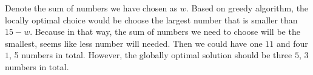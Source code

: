 \documentclass{assignment}
\begin{document}
\begin{homeworkProblem}
\begin{enumerate}
Denote the sum of numbers we have chosen as $w$. 
Based on greedy algorithm, the locally optimal choice would be choose the largest number that is smaller than $15-w$. Because in that way, the sum of numbers we need to choose will be the smallest, seems like less number will needed. Then we could have one $11$ and four $1$, 5 numbers in total. However, the globally optimal solution should be three $5$, 3 numbers in total.

    
    \end{enumerate}
    
    \end{homeworkProblem}
    
\end{document}
